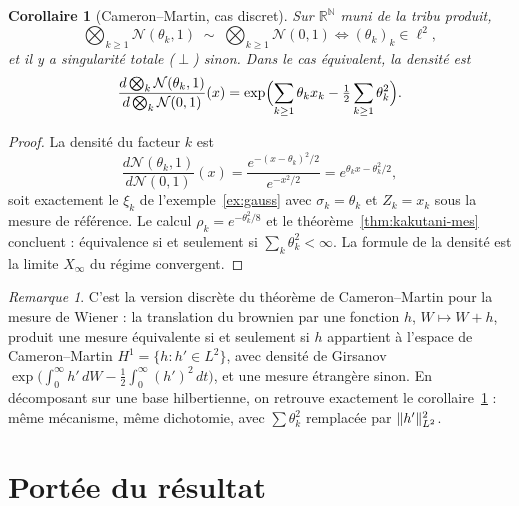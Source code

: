 \documentclass[11pt,a4paper]{article}
\theoremstyle{plain}
\newtheorem{corollary}[theorem]{Corollaire}
\theoremstyle{definition}
\theoremstyle{remark}
\newtheorem{remark}[theorem]{Remarque}
\newcommand{\R}{\mathbb{R}}
\newcommand{\N}{\mathbb{N}}
\DeclarePairedDelimiter{\norm}{\lVert}{\rVert}
\begin{document}
\begin{corollary}[Cameron--Martin, cas discret]\label{cor:CM}
Sur $\R^{\N}$ muni de la tribu produit,
\[
\bigotimes_{k\ge1} \mathcal{N}(\theta_k, 1) \;\sim\; \bigotimes_{k\ge1}
\mathcal{N}(0,1)
\iff
(\theta_k)_k \in \ell^2,
\]
et il y a singularité totale ($\perp$) sinon. Dans le cas équivalent, la
densité est
\[
\frac{d\bigotimes_k \mathcal{N}(\theta_k,1)}{d\bigotimes_k \mathcal{N}(0,1)}(x)
= \exp\Bigl(\sum_{k\ge1}\theta_k x_k - \tfrac12\sum_{k\ge1}\theta_k^2\Bigr).
\]
\end{corollary}

\begin{proof}
La densité du facteur $k$ est
\[
\frac{d\mathcal{N}(\theta_k,1)}{d\mathcal{N}(0,1)}(x)
= \frac{e^{-(x-\theta_k)^2/2}}{e^{-x^2/2}}
= e^{\theta_k x - \theta_k^2/2},
\]
soit exactement le $\xi_k$ de l'exemple~\ref{ex:gauss} avec
$\sigma_k = \theta_k$ et $Z_k = x_k$ sous la mesure de référence. Le calcul
$\rho_k = e^{-\theta_k^2/8}$ et le théorème~\ref{thm:kakutani-mes} concluent :
équivalence si et seulement si $\sum_k \theta_k^2 < \infty$. La formule de la
densité est la limite $X_\infty$ du régime convergent.
\end{proof}

\begin{remark}
C'est la version discrète du théorème de Cameron--Martin pour la mesure de
Wiener : la translation du brownien par une fonction $h$,
$W \mapsto W + h$, produit une mesure équivalente si et seulement si $h$
appartient à l'espace de Cameron--Martin $H^1 = \{h : h' \in L^2\}$, avec
densité de Girsanov
$\exp\bigl(\int_0^\infty h'\,dW - \frac12\int_0^\infty (h')^2\,dt\bigr)$, et
une mesure étrangère sinon. En décomposant sur une base hilbertienne, on
retrouve exactement le corollaire~\ref{cor:CM} : même mécanisme, même
dichotomie, avec $\sum \theta_k^2$ remplacée par $\norm{h'}_{L^2}^2$.
\end{remark}

\section{Portée du résultat}
\end{document}
